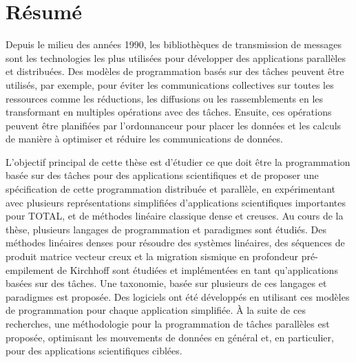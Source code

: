 \chapter*{Résumé}

Depuis le milieu des années 1990, les bibliothèques de transmission de messages sont les technologies les plus utilisées pour développer des applications parallèles et distribuées.
Des modèles de programmation basés sur des tâches peuvent être utilisés, par exemple, pour éviter les communications collectives sur toutes les ressources comme les réductions, les diffusions ou les rassemblements en les transformant en multiples opérations avec des tâches.
Ensuite, ces opérations peuvent être planifiées par l'ordonnanceur pour placer les données et les calculs de manière à optimiser et réduire les communications de données.

L'objectif principal de cette thèse est d'étudier ce que doit être la programmation basée sur des tâches pour des applications scientifiques et de proposer une spécification de cette programmation distribuée et parallèle, en expérimentant avec plusieurs représentations simplifiées d'applications scientifiques importantes pour TOTAL, et de méthodes linéaire classique dense et creuses.
Au cours de la thèse, plusieurs langages de programmation et paradigmes sont étudiés.
Des méthodes linéaires denses pour résoudre des systèmes linéaires, des séquences de produit matrice vecteur creux et la migration sismique en profondeur pré-empilement de Kirchhoff sont étudiées et implémentées en tant qu'applications basées sur des tâches.
Une taxonomie, basée sur plusieurs de ces langages et paradigmes est proposée.
Des logiciels ont été développés en utilisant ces modèles de programmation pour chaque application simplifiée.
À la suite de ces recherches, une méthodologie pour la programmation de tâches parallèles est proposée, optimisant les mouvements de données en général et, en particulier, pour des applications scientifiques ciblées.

